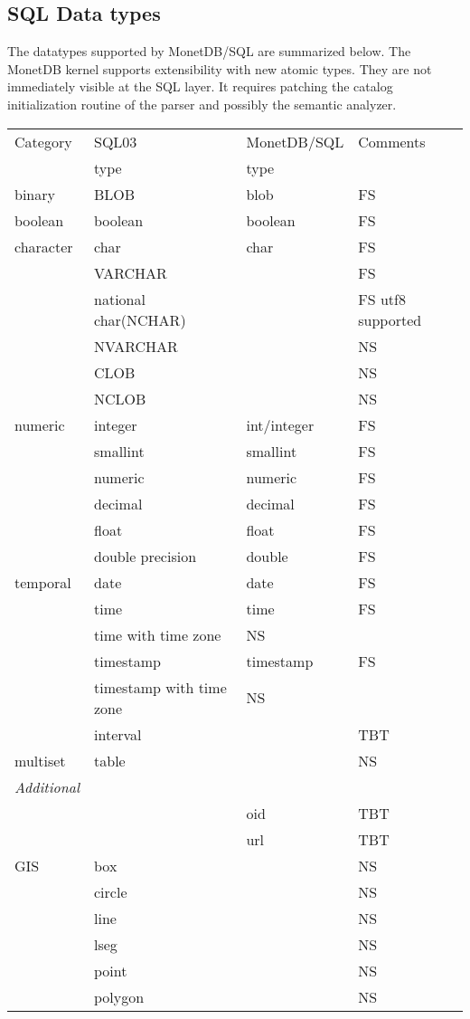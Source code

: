 \documentclass[10pt,twocolumn,fleqn]{article}
\begin{document}
\subsection{SQL Data types}
The datatypes supported by MonetDB/SQL are summarized below.
The MonetDB kernel supports extensibility with new atomic types.
They are not immediately visible at the SQL layer. It requires
patching the catalog initialization routine of the parser
and possibly the semantic analyzer.

\begin{tabular}{l |l | l | l}
Category	& SQL03 & MonetDB/SQL & Comments\\
		& type	& type	&	\\\hline
binary		& BLOB	& blob	& FS 	\\
boolean		& boolean& boolean& FS		\\
character	& char	& char	& FS	\\
		& VARCHAR &	& FS	\\
		& national char(NCHAR)&& FS utf8 supported\\
		& NVARCHAR&	& 	NS\\
		& CLOB	&	&	NS\\
		& NCLOB	&	&	NS\\
numeric		& integer& int/integer & FS\\
		& smallint&smallint& FS	\\
		&numeric &numeric& FS	\\
		& decimal&decimal& FS	 \\
		& float & float& FS	\\
		& double precision& double& FS	\\
temporal	& date & date& FS	\\
		& time & time& FS \\
		& time with time zone& NS\\
		& timestamp& timestamp& FS	\\
		& timestamp with time zone& NS\\
		& interval &	& TBT\\\hline
multiset	& table & & NS \\
{\em Additional}&	&	&	\\
		&	& oid	& TBT\\
		&	& url	& TBT\\
GIS & box	& & NS\\
		&circle	& & NS\\
		&line	& & NS\\
		&lseg	& & NS\\
		&point	& & NS\\
		&polygon & & NS\\
\end{tabular}
\end{document}
